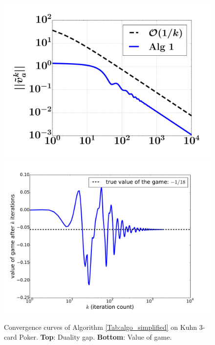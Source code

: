 \documentclass[12pt]{article}
\begin{document}
\begin{figure}
  \includegraphics[width=1\linewidth]{Kuhn3112_dgap.pdf}
  \includegraphics[width=1\linewidth]{Kuhn3112_NE.pdf}
  \caption{Convergence curves of Algorithm \ref{Tab:algo_simplified} on Kuhn 3-card Poker.
  \textbf{Top}: Duality gap. \textbf{Bottom}: Value of game.}
  \label{Tab:dgap_curve}
\end{figure}

\end{document}
